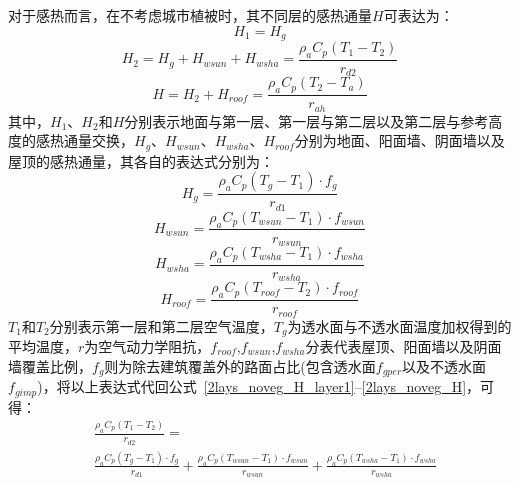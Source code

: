 对于感热而言，在不考虑城市植被时，其不同层的感热通量$H$可表达为：
\begin{equation}\label{2lays_noveg_H_layer1}
    H_{1} = H_{g}
\end{equation}
%
\begin{equation}\label{2lays_noveg_H_layer2}
    H_{2} = H_{g} + H_{wsun} + H_{wsha} = \frac{\rho _a C_p \left( T_{1} - T_{2} \right)}{r_{d2}}
\end{equation}
%
\begin{equation}\label{2lays_noveg_H}
    H = H_{2} + H_{roof} = \frac{\rho _a C_p \left( T_{2} - T_a \right)}{r_{ah}}
\end{equation}
其中，$H_1$、$H_2$和$H$分别表示地面与第一层、第一层与第二层以及第二层与参考高度的感热通量交换，$H_{g}$、$H_{wsun}$、$H_{wsha}$、$H_{roof}$分别为地面、阳面墙、阴面墙以及屋顶的感热通量，其各自的表达式分别为：
\begin{equation}\label{urban_noveg_Hg}
    H_{g} = \frac{\rho _a C_p \left( T_{g} - T_{1} \right) \cdot f_{g}}{r_{d1}}
\end{equation}
%
\begin{equation}
    H_{wsun} = \frac{\rho  _a C_p \left( T_{wsun} - T_{1} \right) \cdot f_{wsun}}{r_{wsun}}
\end{equation}
%
\begin{equation}
    H_{wsha} = \frac{\rho _a C_p \left( T_{wsha} - T_{1} \right) \cdot f_{wsha}}{r_{wsha}}
\end{equation}
%
\begin{equation}\label{urban_noveg_Hroof}
    H_{roof} = \frac{\rho _a C_p \left( T_{roof} - T_{2} \right) \cdot f_{roof}}{r_{roof}}
\end{equation}
$T_1$和$T_2$分别表示第一层和第二层空气温度，$T_{g}$为透水面与不透水面温度加权得到的平均温度，$r$为空气动力学阻抗，\allowbreak $f_{roof}$,\allowbreak  $f_{wsun}$,\allowbreak  $f_{wsha}$分表代表屋顶、阳面墙以及阴面墙覆盖比例，$f_{g}$则为除去建筑覆盖外的路面占比(包含透水面$f_{gper}$以及不透水面$f_{gimp}$)，将以上表达式代回公式~\eqref{2lays_noveg_H_layer1}--\eqref{2lays_noveg_H}，可得：
\begin{equation}
    \begin{split}
        & \frac{\rho _a C_p \left( T_{1} - T_{2} \right)}{r_{d2}} = \\
        & \frac{\rho _a C_p \left( T_{g} - T_{1} \right) \cdot f_{g}}{r_{d1}} + \frac{\rho _a C_p \left( T_{wsun} - T_{1} \right) \cdot f_{wsun}}{r_{wsun}} + \frac{\rho _a C_p \left( T_{wsha} - T_{1} \right) \cdot f_{wsha}}{r_{wsha}}
    \end{split}
\end{equation}
